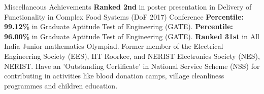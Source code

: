 \begin{rubric}{Miscellaneous Achievements}
    \entry*[2017] \textbf{Ranked 2nd}  in poster presentation in Delivery of Functionality in Complex Food Systems (DoF 2017) Conference
    \entry*[2011] \textbf{Percentile: 99.12\%} in Graduate Aptitude Test of Engineering (GATE).
    \entry*[2010] \textbf{Percentile: 96.00\%} in Graduate Aptitude Test of Engineering (GATE).
    \entry*[2004] \textbf{Ranked 31st} in All India Junior mathematics Olympiad.
    \entry*[2014] Former member of the Electrical Engineering Society (EES), IIT Roorkee, and NERIST Electronics Society (NES), NERIST.
    \entry*[2006] Have an 'Outstanding  Certificate' in National Service Scheme (NSS) for contributing  in activities like blood donation camps, village cleanliness programmes and children education.
    
    \end{rubric}